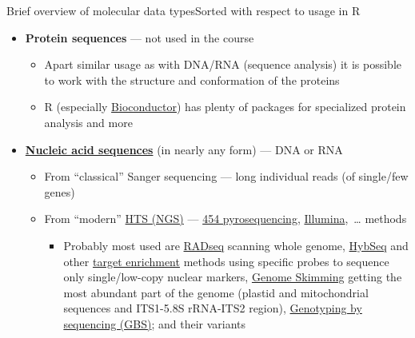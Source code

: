 \documentclass[compress, ucs, xelatex, 11pt, xcolor=svgnames, aspectratio=169,
	hyperref={
		bookmarks=true,
		unicode=true,
		colorlinks=true,
		pdftitle={Molecular data in R},
		plainpages=false,
		pdfauthor={Vojtech Zeisek},
		pdfsubject={Course about phylogeny and evolution in R},
		pdfcreator={XeLaTeX},
		pdfkeywords={R, evolution, phylogeny, molecular data},
		linkcolor=Crimson, %
		anchorcolor=Magenta, %
		citecolor=Magenta, %
		filecolor=Magenta, %
		menucolor=Magenta, %
		urlcolor=DodgerBlue, %
		pdftex},
	url={hyphens, lowtilde} %
	]{beamer}
\begin{document}
\begin{frame}[allowframebreaks]{Brief overview of molecular data types}{Sorted with respect to usage in R}
\begin{itemize}
\begin{itemize}
			\begin{itemize}
				\item The allele \textbf{is} or \textbf{is not} present  --- it is impossible to distinguish heterozygots from dominant homozygots
				\item \href{https://en.wikipedia.org/wiki/Amplified_fragment_length_polymorphism}{AFLP} (Amplified Fragment Length Polymorphism) --- very variable, technically complicated, nowadays bit expensive and outdated
				\item Simpler methods \href{https://en.wikipedia.org/wiki/RAPD}{RAPD} (Random Amplified Polymorphic DNA) and \href{https://en.wikipedia.org/wiki/Restriction_fragment_length_polymorphism}{PCR-RFLP} (Polymerase Chain Reaction-Restriction Fragment Length Polymorphism) are not used anymore at all
			\end{itemize}
		\end{itemize}
		\item \textbf{Protein sequences} --- not used in the course
		\begin{itemize}
			\item Apart similar usage as with DNA/RNA (sequence analysis) it is possible to work with the structure and conformation of the proteins
			\item R (especially \href{https://bioconductor.org/}{Bioconductor}) has plenty of packages for specialized protein analysis and more
		\end{itemize}
		\item \textbf{\href{https://en.wikipedia.org/wiki/Nucleic_acid_sequence}{Nucleic acid sequences}} (in nearly any form) --- DNA or RNA
		\begin{itemize}
			\item From \enquote{classical} Sanger sequencing --- long individual reads (of single/few genes)
			\item From \enquote{modern} \href{https://en.wikipedia.org/wiki/DNA_sequencing\#High-throughput_methods}{HTS (NGS)} --- \href{https://en.wikipedia.org/wiki/Pyrosequencing}{454 pyrosequencing}, \href{https://en.wikipedia.org/wiki/Illumina_dye_sequencing}{Illumina},~\ldots{ }methods
			\begin{itemize}
				\item Probably most used are \href{https://en.wikipedia.org/wiki/Restriction_site_associated_DNA_markers}{RADseq} scanning whole genome, \href{https://bsapubs.onlinelibrary.wiley.com/doi/abs/10.3732/apps.1400042}{HybSeq} and other \href{https://en.wikipedia.org/wiki/Exome_sequencing}{target enrichment} methods using specific probes to sequence only single/low-copy nuclear markers, \href{https://bsapubs.onlinelibrary.wiley.com/doi/abs/10.3732/ajb.1100335}{Genome Skimming} getting the most abundant part of the genome (plastid and mitochondrial sequences and ITS1-5.8S rRNA-ITS2 region), \href{https://en.wikipedia.org/wiki/Genotyping_by_sequencing}{Genotyping by sequencing (GBS)}; and their variants

\end{itemize}
\end{itemize}
\end{itemize}
\end{frame}
\end{document}
